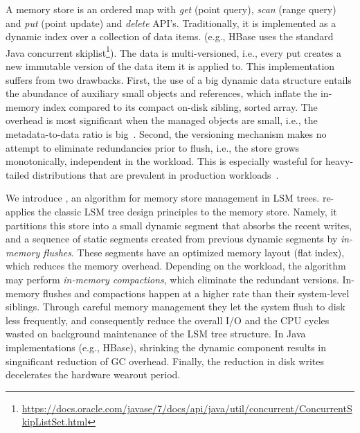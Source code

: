 A memory store is an ordered map with {\em get} (point query), {\em scan} (range query) and {\em put} 
(point update) and {\em delete} API's. Traditionally, it is implemented as a dynamic index over a collection of data items. 
(e.g., HBase uses the standard Java concurrent skiplist\footnote{\small{\url{https://docs.oracle.com/javase/7/docs/api/java/util/concurrent/ConcurrentSkipListSet.html}}}).
The data is multi-versioned, i.e., every put creates a new immutable version of the data item it is applied to. 
This implementation suffers from two drawbacks. First, the use of a big dynamic data structure entails 
the abundance of auxiliary small objects and references, which inflate the in-memory index compared 
to its compact on-disk sibling, sorted array. The overhead is most significant when the managed objects
are small, i.e., the metadata-to-data ratio is big~\cite{Wu2015}. Second, the versioning mechanism makes 
no attempt to eliminate redundancies prior to flush, i.e., the store grows monotonically, independent in the workload. 
This is especially wasteful for heavy-tailed distributions that are prevalent in production workloads~\cite{Devineni:2015}.

We introduce \sys, an algorithm for memory store management in LSM trees. %
\sys\/ re-applies the classic LSM tree design principles to the memory store. Namely, it partitions this store
 into a small dynamic segment that absorbs the recent writes, and a sequence of static segments created 
 from previous dynamic segments by {\em in-memory flushes}. These segments have an optimized memory
 layout (flat index), which reduces the memory overhead. Depending on the workload, the algorithm may 
 perform {\em in-memory compactions}, which eliminate the redundant versions. In-memory flushes and 
 compactions happen at a higher rate than their system-level siblings. Through careful memory management 
 they let the system flush to disk less frequently, and consequently reduce the overall I/O and the CPU cycles
 wasted on background maintenance of the LSM tree structure. In Java implementations (e.g., HBase), shrinking 
 the dynamic component results in singnificant reduction of GC overhead. Finally, the reduction in disk writes  
decelerates the hardware wearout period. 

